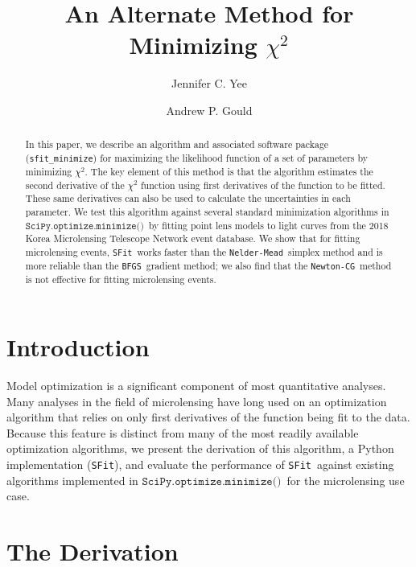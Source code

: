 \documentclass[preprint]{aastex631}
\newcommand{\minimize}{$\texttt{SciPy.optimize.minimize()}$}
\newcommand{\neldermead}{\texttt{Nelder-Mead}}
\newcommand{\newtoncg}{\texttt{Newton-CG}}
\newcommand{\bfgs}{\texttt{BFGS}}
\newcommand{\sfit}{\texttt{SFit}}
\begin{document}
\title{An Alternate Method for Minimizing $\chi^2$}

\author{Jennifer C. Yee}
\author{Andrew P. Gould}

\begin{abstract}
In this paper, we describe an algorithm and associated software package (\texttt{sfit\_minimize}) for maximizing the likelihood function of a set of parameters by minimizing $\chi^2$. The key element of this method is that the algorithm estimates the second derivative of the $\chi^2$ function using first derivatives of the function to be fitted. These same derivatives can also be used to calculate the uncertainties in each parameter. We test this algorithm against several standard minimization algorithms in \minimize\, by fitting point lens models to light curves from the 2018 Korea Microlensing Telescope Network event database. We show that for fitting microlensing events, \sfit\, works faster than the \neldermead\, simplex method and is more reliable than the \bfgs\, gradient method; we also find that the \newtoncg\, method is not effective for fitting microlensing events.
\end{abstract}

\section{Introduction}

Model optimization is a significant component of most quantitative analyses. Many analyses in the field of microlensing have long used on an optimization algorithm that relies on only first derivatives of the function being fit to the data. Because this feature is distinct from many of the most readily available optimization algorithms, we present the derivation of this algorithm, a Python implementation (\sfit), and evaluate the performance of \sfit\, against existing algorithms implemented in \minimize\, for the microlensing use case.

{\section{The Derivation}
\label{sec:der}}
\end{document}
